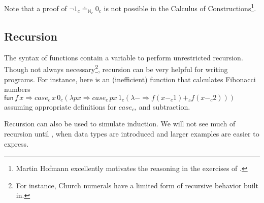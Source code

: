 Note that a proof of $\lnot1_{c}\doteq_{\mathbb{N}_{c}}0_{c}$ is not possible in the Calculus of Constructions\cite{10.2307/2274575}\footnote{
  Martin Hofmann excellently motivates the reasoning in the exercises of \cite{hofmann_1997}.
}.

\subsection{Recursion}

The syntax of functions contain a variable to perform unrestricted recursion.
Though not always necessary\footnote{
  For instance, Church numerals have a limited form of recursive behavior built in.
}, recursion can be very helpful for writing programs.
For instance, here is an (inefficient) function that calculates Fibonacci numbers
$\mathsf{fun}\,f\,x\Rightarrow case_{c}\,x\,0_{c}\left(\lambda px\Rightarrow case_{c}\,px\,1_{c}\left(\lambda-\Rightarrow f\left(x-_{c}1\right)+_{c}f\left(x-_{c}2\right)\right)\right)$
assuming appropriate definitions for $case_{c}$, and subtraction.

Recursion can also be used to simulate induction. 
We will not see much of recursion until , when data types are introduced and larger examples are easier to express.
